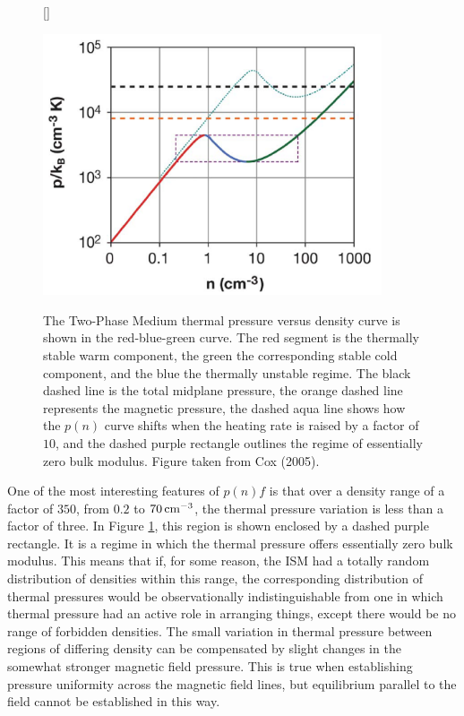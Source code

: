 \documentclass[a4paper,10pt]{article}
\begin{document}
\begin{figure}[h]
    [\FBwidth]
    {\caption{\footnotesize{The Two-Phase Medium thermal pressure versus density curve is shown in the red-blue-green curve. The red segment is the thermally stable warm component, the green the corresponding stable cold component, and the blue the thermally unstable regime. The black dashed line is the total midplane pressure, the orange dashed line represents the magnetic pressure, the dashed aqua line shows how the $p(n)$ curve shifts when the heating rate is raised by a factor of $10$, and the dashed purple rectangle outlines the regime of essentially zero bulk modulus. Figure taken from Cox (2005).}}
    \label{fig:pressure-density}}
    {\includegraphics[width=10cm]{figures/pressure-density.png}}
\end{figure}

{\noindent}One of the most interesting features of $p(n)f$ is that over a density range of a factor of $350$, from $0.2$ to $70\,{\rm cm^{-3}}$, the thermal pressure variation is less than a factor of three. In Figure \ref{fig:pressure-density}, this region is shown enclosed by a dashed purple rectangle. It is a regime in which the thermal pressure offers essentially zero bulk modulus. This means that if, for some reason, the ISM had a totally random distribution of densities within this range, the corresponding distribution of thermal pressures would be observationally indistinguishable from one in which thermal pressure had an active role in arranging things, except there would be no range of forbidden densities. The small variation in thermal pressure between regions of differing density can be compensated by slight changes in the somewhat stronger magnetic field pressure. This is true when establishing pressure uniformity across the magnetic field lines, but equilibrium parallel to the field cannot be established in this way.
\end{document}
